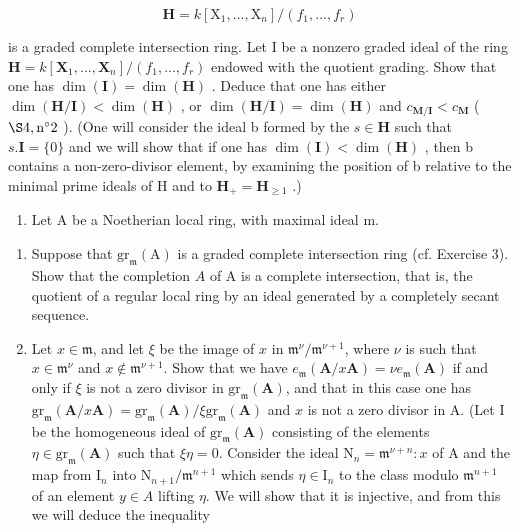 \[
\mathbf {H} = k [ \mathrm{X} _ {1},..., \mathrm{X} _ {n} ] / (f _ {1},..., f _ {r})
\]

is a graded complete intersection ring. Let I be a nonzero graded ideal of the ring \(\mathbf{H} = k[\mathbf{X}_1, \ldots, \mathbf{X}_n] / (f_1, \ldots, f_r)\) endowed with the quotient grading. Show that one has \(\dim(\mathbf{I}) = \dim(\mathbf{H})\) . Deduce that one has either \(\dim(\mathbf{H}/\mathbf{I}) < \dim(\mathbf{H})\) , or \(\dim(\mathbf{H}/\mathbf{I}) = \dim(\mathbf{H})\) and \(c_{\mathbf{M}/\mathbf{I}} < c_{\mathbf{M}}\) ( \(\S 4, \text{n}^{\circ} 2\) ). (One will consider the ideal b formed by the \(s \in \mathbf{H}\) such that \(s.\mathbf{I} = \{0\}\) and we will show that if one has \(\dim(\mathbf{I}) < \dim(\mathbf{H})\) , then b contains a non-zero-divisor element, by examining the position of b relative to the minimal prime ideals of H and to \(\mathbf{H}_{+} = \mathbf{H}_{\geqslant 1}\) .)

\begin{enumerate}
\def\labelenumi{\arabic{enumi})}
\setcounter{enumi}{3}
\tightlist
\item
  Let A be a Noetherian local ring, with maximal ideal m.
\end{enumerate}

\begin{enumerate}
\def\labelenumi{\alph{enumi})}
\item
  Suppose that \(\mathrm{gr}_{\mathfrak{m}}(\mathrm{A})\) is a graded complete intersection ring (cf. Exercise 3). Show that the completion \(\widehat{A}\) of A is a complete intersection, that is, the quotient of a regular local ring by an ideal generated by a completely secant sequence.
\item
  Let \(x \in \mathfrak{m}\), and let \(\xi\) be the image of \(x\) in \(\mathfrak{m}^{\nu}/\mathfrak{m}^{\nu+1}\), where \(\nu\) is such that \(x \in \mathfrak{m}^{\nu}\) and \(x \notin \mathfrak{m}^{\nu+1}\). Show that we have \(e_{\mathfrak{m}}(\mathbf{A}/x\mathbf{A}) = \nu e_{\mathfrak{m}}(\mathbf{A})\) if and only if \(\xi\) is not a zero divisor in \(\mathrm{gr}_{\mathfrak{m}}(\mathbf{A})\), and that in this case one has \(\mathrm{gr}_{\mathfrak{m}}(\mathbf{A}/x\mathbf{A}) = \mathrm{gr}_{\mathfrak{m}}(\mathbf{A})/\xi\mathrm{gr}_{\mathfrak{m}}(\mathbf{A})\) and \(x\) is not a zero divisor in A. (Let I be the homogeneous ideal of \(\mathrm{gr}_{\mathfrak{m}}(\mathbf{A})\) consisting of the elements \(\eta \in \mathrm{gr}_{\mathfrak{m}}(\mathbf{A})\) such that \(\xi\eta = 0\). Consider the ideal \(\mathrm{N}_n = \mathfrak{m}^{\nu+n}:x\) of A and the map from \(\mathrm{I}_n\) into \(\mathrm{N}_{n+1}/\mathfrak{m}^{n+1}\) which sends \(\eta \in \mathrm{I}_n\) to the class modulo \(\mathfrak{m}^{n+1}\) of an element \(y \in A\) lifting \(\eta\). We will show that it is injective, and from this we will deduce the inequality
\end{enumerate}

